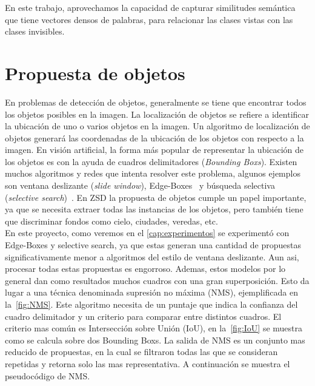 En este trabajo, aprovechamos la capacidad de capturar similitudes semántica que tiene vectores densos de palabras, para relacionar las clases vistas con las clases invisibles.\\


\section{Propuesta de objetos} \label{sec:propuestadeobjetos}
En problemas de detección de objetos, generalmente se tiene que encontrar todos los objetos posibles en la imagen. La localización de objetos se refiere a identificar la ubicación de uno o varios objetos en la imagen. Un algoritmo de localización de objetos generará las coordenadas de la ubicación de los objetos con respecto a la imagen. En visión artificial, la forma más popular de representar la ubicación de los objetos es con la ayuda de cuadros delimitadores (\textit{Bounding Boxs}). Existen muchos algoritmos y redes que intenta resolver este problema, algunos ejemplos son ventana deslizante (\textit{slide window}), Edge-Boxes~\cite{zitnick2014edge} y búsqueda selectiva (\textit{selective search})~\cite{uijlings2013selective}. En ZSD la propuesta de objetos cumple un papel importante, ya que se necesita extraer todas las instancias de los objetos, pero también tiene que discriminar fondos como cielo, ciudades, veredas, etc.\\

En este proyecto, como veremos en el \autoref{cap:experimentos} se experimentó con Edge-Boxes y selective search, ya que estas generan una cantidad de propuestas significativamente menor a algoritmos del estilo de ventana deslizante. Aun asi, procesar todas estas propuestas es engorroso. Ademas, estos modelos por lo general dan como resultados muchos cuadros con una gran superposición. Esto da lugar a una técnica denominada supresión no máxima (NMS), ejemplificada en la~\autoref{fig:NMS}. Este algoritmo necesita de un puntaje que indica la confianza del cuadro delimitador y un criterio para comparar entre distintos cuadros. El criterio mas común es Intersección sobre Unión (IoU), en la~\autoref{fig:IoU} se muestra como se calcula sobre dos Bounding Boxs. La salida de NMS es un conjunto mas reducido de propuestas, en la cual se filtraron todas las que se consideran repetidas y retorna solo las mas representativa. A continuación se muestra el pseudocódigo de NMS.

\begin{center}
\noindent{}
\end{center}

